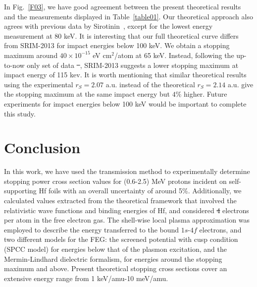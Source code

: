 \documentclass[aps,pra,reprint,groupedaddress,showpacs,showkeys]{revtex4-1} %
\providecommand{\DIFadd}[1]{{\protect\color{blue}\uwave{#1}}} %
\providecommand{\DIFdel}[1]{{\protect\color{red}\sout{#1}}}                      %
\providecommand{\DIFaddbegin}{} %
\providecommand{\DIFaddend}{} %
\providecommand{\DIFdelbegin}{} %
\providecommand{\DIFdelend}{} %
\newcommand{\DIFscaledelfig}{0.5}
\newlength{\DIFdelgraphicswidth} %
\newlength{\DIFdelgraphicsheight} %
\newcommand{\DIFaddincludegraphics}[2][]{{\color{blue}\fbox{\DIFOincludegraphics[#1]{#2}}}} %
\newcommand{\DIFdelincludegraphics}[2][]{%
\sbox{\DIFdelgraphicsbox}{\DIFOincludegraphics[#1]{#2}}%
\settoboxwidth{\DIFdelgraphicswidth}{\DIFdelgraphicsbox} %
\settoboxtotalheight{\DIFdelgraphicsheight}{\DIFdelgraphicsbox} %
\scalebox{\DIFscaledelfig}{%
\parbox[b]{\DIFdelgraphicswidth}{\usebox{\DIFdelgraphicsbox}\\[-\baselineskip] \rule{\DIFdelgraphicswidth}{0em}}\llap{\resizebox{\DIFdelgraphicswidth}{\DIFdelgraphicsheight}{%
\setlength{\unitlength}{\DIFdelgraphicswidth}%
\begin{picture}(1,1)%
\thicklines\linethickness{2pt} %
{\color[rgb]{1,0,0}\put(0,0){\framebox(1,1){}}}%
{\color[rgb]{1,0,0}\put(0,0){\line( 1,1){1}}}%
{\color[rgb]{1,0,0}\put(0,1){\line(1,-1){1}}}%
\end{picture}%
}\hspace*{3pt}}} %
} %
\DeclareRobustCommand{\DIFaddbegin}{\DIFOaddbegin \let\includegraphics\DIFaddincludegraphics} %
\DeclareRobustCommand{\DIFaddend}{\DIFOaddend \let\includegraphics\DIFOincludegraphics} %
\DeclareRobustCommand{\DIFdelbegin}{\DIFOdelbegin \let\includegraphics\DIFdelincludegraphics} %
\DeclareRobustCommand{\DIFdelend}{\DIFOaddend \let\includegraphics\DIFOincludegraphics} %
\begin{document}
In Fig.~\ref{F03}, we have good agreement between the present 
theoretical results and the measurements displayed in Table~\ref{table01}. 
Our theoretical approach also agrees with previous data by 
Sirotinin~\cite{Sirotinin}, except for the lowest energy measurement at 
80 keV. It is interesting that our full theoretical curve differs from 
SRIM-2013 for impact energies below 100 keV. We obtain a stopping 
maximum around $40 \times 10^{-15}$ eV cm$^2$/atom  at 65 keV. Instead, 
following the up-to-now only set of data \DIFdelbegin \DIFdel{~}\DIFdelend \cite{Sirotinin}, SRIM-2013 
suggests a lower stopping maximum  at impact energy of 115 kev. It is 
worth mentioning that similar theoretical results using the experimental 
$r_S=2.07$ a.u. instead of the theoretical $r_S=2.14$ a.u. give the 
stopping maximum at the same impact energy but $4\%$ higher. Future 
experiments for impact energies below 100 keV would be important to 
complete this study.

\section{Conclusion}
\label{conclusion}
\DIFaddbegin 

\DIFaddend In this work, we have used the transmission method to experimentally 
determine stopping power cross section values for (0.6-2.5) MeV protons 
incident on self-supporting Hf foils with an overall uncertainty of 
around 5\%. Additionally, we calculated values extracted from the 
theoretical framework that involved the relativistic wave functions and 
binding energies of Hf, and considered \DIFdelbegin \DIFdel{4 }\DIFdelend \DIFaddbegin \DIFadd{four }\DIFaddend electrons per atom in the free 
electron gas. The shell-wise local plasma approximation was employed to 
describe the energy transferred to the bound $1s$-$4f$ electrons, and 
two different models for the FEG: the screened potential with cusp 
condition (SPCC model) for energies below that of the plasmon 
excitation, and the Mermin-Lindhard dielectric formalism, for energies 
around the stopping maximum and above. Present theoretical stopping 
cross sections cover an extensive energy range from 1 keV/amu-10 meV/amu.
\end{document}
